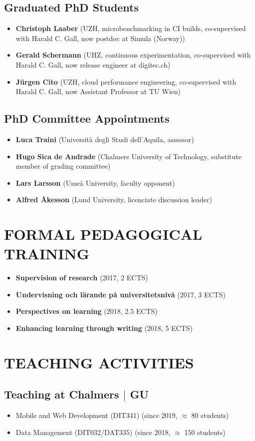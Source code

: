 \documentclass[paper=letter,fontsize=11pt]{scrartcl} %
\newcommand{\NewPart}[2]{\section*{\uppercase{#1} #2}}
\begin{document}
\subsection*{Graduated PhD Students}

\begin{itemize}
\item \textbf{Christoph Laaber} (UZH, microbenchmarking in CI builds, co-supervised with Harald C. Gall, now postdoc at Simula (Norway))
\item \textbf{Gerald Schermann} (UHZ, continuous experimentation, co-supervised with Harald C. Gall, now release engineer at digitec.ch)
\item \textbf{J\"urgen Cito} (UZH, cloud performance engineering, co-supervised with Harald C. Gall, now Assistant Professor at TU Wien)
\end{itemize}

\subsection*{PhD Committee Appointments}

\begin{itemize}
\item \textbf{Luca Traini} (Università degli Studi dell'Aquila, assessor) 
\item \textbf{Hugo Sica de Andrade} (Chalmers University of Technology, substitute member of grading committee) 
\item \textbf{Lars Larsson} (Umeå University, faculty opponent)
\item \textbf{Alfred Åkesson} (Lund University, licenciate discussion leader)
\end{itemize}

\NewPart{Formal Pedagogical Training}{}

\begin{itemize}
\item \textbf{Supervision of research} (2017, 2 ECTS)
\item \textbf{Undervisning och lärande på universitetsnivå}  (2017, 3 ECTS)
\item \textbf{Perspectives on learning}  (2018, 2.5 ECTS)
\item \textbf{Enhancing learning through writing} (2018, 5 ECTS)
\end{itemize}

\NewPart{Teaching Activities}{}

\subsection*{Teaching at Chalmers $|$ GU}
\begin{itemize}
	\item Mobile and Web Development (DIT341) (since 2019, $\approx$ 80 students)
  \item Data Management (DIT032/DAT335) (since 2018, $\approx$ 150 students)
\end{itemize}
\end{document}

